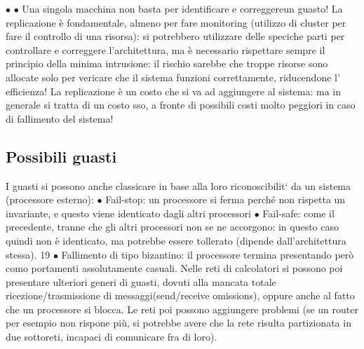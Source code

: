 $\bullet$ 
$\bullet$ 
Una singola macchina non basta per identificare e correggereun guasto! La
replicazione è fondamentale, almeno per fare monitoring (utilizzo di cluster per
fare il controllo di una risorsa): si potrebbero utilizzare delle speciche parti
per controllare e correggere l'architettura, ma è necessario rispettare sempre il
principio della minima intrusione: il rischio sarebbe che troppe risorse sono
allocate solo per vericare che il sistema funzioni correttamente, riducendone l'
efficienza! La replicazione è un costo che si va ad aggiungere al sistema: ma in
generale si tratta di un costo sso, a fronte di possibili costi molto peggiori in
caso di fallimento del sistema!
\subsection{Possibili guasti}
I guasti si possono anche classicare in base alla loro riconoscibilit` da un sistema
(processore esterno):
$\bullet$ Fail-stop: un processore si ferma perché non rispetta un invariante, e
questo viene identicato dagli altri processori
$\bullet$ Fail-safe: come il precedente, tranne che gli altri processori non se ne
accorgono: in questo caso quindi non è identicato, ma potrebbe essere
tollerato (dipende dall'architettura stessa).
19
$\bullet$ Fallimento di tipo bizantino: il processore termina presentando però como
portamenti assolutamente casuali.
Nelle reti di calcolatori si possono poi presentare ulteriori generi di guasti, dovuti
alla mancata totale ricezione/trasmissione di messaggi(send/receive omissions),
oppure anche al fatto che un processore si blocca. Le reti poi possono aggiungere
problemi (se un router per esempio non rispone più, si potrebbe avere che la
rete risulta partizionata in due sottoreti, incapaci di comunicare fra di loro).
